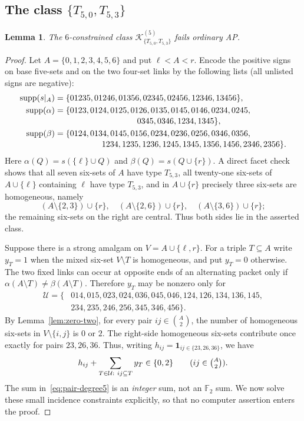 \documentclass[11pt,a4paper]{article}
\newtheorem{lemma}[theorem]{Lemma}
\theoremstyle{remark}
\newcommand{\K}{\mathcal K}
\newcommand{\supp}{\operatorname{supp}}
\begin{document}
\subsection{The class $\{T_{5,0},T_{5,3}\}$}
\begin{lemma}\label{lem:5-two}
The $6$-constrained class
$\K^{(5)}_{\{T_{5,0},T_{5,3}\}}$ fails ordinary AP.
\end{lemma}
\begin{proof}
Let $A=\{0,1,2,3,4,5,6\}$ and put $\ell<A<r$.
Encode the positive signs on base five-sets and on the two four-set
links by the following lists (all unlisted signs are negative):
\begin{align*}
\supp(s|_A)&=\{01235,01246,01356,02345,02456,12346,13456\},\\
\supp(\alpha)&=\{0123,0124,0125,0126,0135,0145,0146,0234,0245,\\[-2pt]
 &\hspace{35mm}0345,0346,1234,1345\},\\
\supp(\beta)&=\{0124,0134,0145,0156,0234,0236,0256,0346,0356,\\[-2pt]
 &\hspace{20mm}1234,1235,1236,1245,1345,1356,1456,2346,2356\}.
\end{align*}
Here $\alpha(Q)=s(\{\ell\}\cup Q)$ and
$\beta(Q)=s(Q\cup\{r\})$.  A direct facet check shows that all
seven six-sets of $A$ have type $T_{5,3}$, all twenty-one six-sets
of $A\cup\{\ell\}$ containing $\ell$ have type $T_{5,3}$, and
in $A\cup\{r\}$ precisely three six-sets are homogeneous, namely
\[
 (A\setminus\{2,3\})\cup\{r\},\quad
 (A\setminus\{2,6\})\cup\{r\},\quad
 (A\setminus\{3,6\})\cup\{r\};
\]
the remaining six-sets on the right are central.  Thus both sides
lie in the asserted class.

Suppose there is a strong amalgam on
$V=A\cup\{\ell,r\}$.  For a triple $T\subseteq A$ write
$y_T=1$ when the mixed six-set $V\setminus T$ is homogeneous, and
put $y_T=0$ otherwise.  The two fixed links can occur at opposite
ends of an alternating packet only if
$\alpha(A\setminus T)\ne\beta(A\setminus T)$.  Therefore $y_T$
may be nonzero only for
\begin{equation}\label{eq:eligible5}
\begin{split}
\mathcal U=\{&014,015,023,024,036,045,046,124,126,134,136,145,\\
 &234,235,246,256,345,346,456\}.
\end{split}
\end{equation}
By Lemma~\ref{lem:zero-two}, for every pair
$ij\in\binom A2$, the number of homogeneous six-sets in
$V\setminus\{i,j\}$ is $0$ or $2$.  The right-side homogeneous
six-sets contribute once exactly for pairs $23,26,36$.
Thus, writing $h_{ij}=\mathbf1_{ij\in\{23,26,36\}}$, we have
\begin{equation}\label{eq:pair-degree5}
 h_{ij}+\sum_{T\in\mathcal U:\ ij\subseteq T}y_T\in\{0,2\}
 \qquad (ij\in\tbinom A2).
\end{equation}
The sum in~\eqref{eq:pair-degree5} is an \emph{integer} sum,
not an $\mathbb F_2$ sum. We now solve these small incidence
constraints explicitly,
so that no computer assertion enters the proof.


\end{proof}
\end{document}
